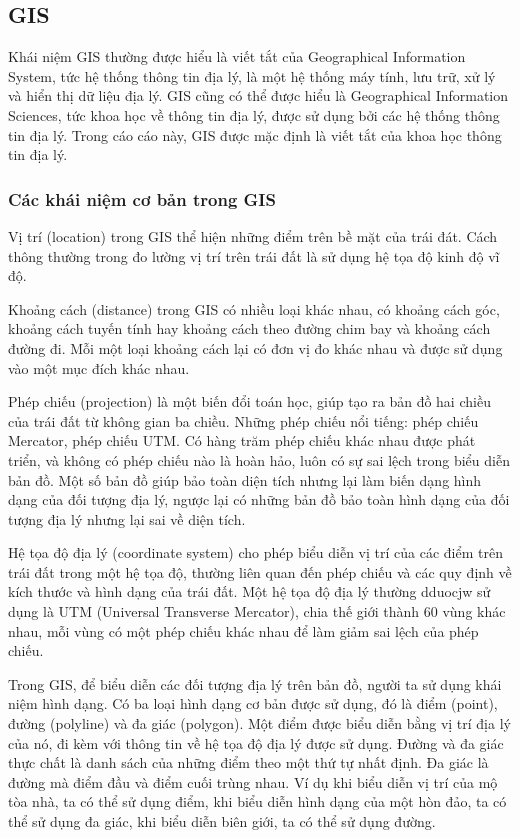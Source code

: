 \documentclass[14pt, oneside, a4paper, openany]{scrartcl}
\begin{document}
\subsection{GIS}
Khái niệm GIS thường được hiểu là viết tắt của Geographical Information System, tức hệ thống thông tin địa lý, là một hệ thống máy tính, lưu trữ, xử lý và hiển thị dữ liệu địa lý.
GIS cũng có thể được hiểu là Geographical Information Sciences, tức khoa học về thông tin địa lý, được sử dụng bởi các hệ thống thông tin địa lý. Trong cáo cáo này, GIS được mặc định là viết tắt của khoa học thông tin địa lý.
\subsubsection{Các khái niệm cơ bản trong GIS}
Vị trí (location) trong GIS thể hiện những điểm trên bề mặt của trái đát. Cách thông thường trong đo lường vị trí trên trái đất là sử dụng hệ tọa độ kinh độ vĩ độ.

Khoảng cách (distance) trong GIS có nhiều loại khác nhau, có khoảng cách góc, khoảng cách tuyến tính hay khoảng cách theo đường chim bay và khoảng cách đường đi. Mỗi một loại khoảng cách lại có đơn vị đo khác nhau và được sử dụng vào một mục đích khác nhau.

Phép chiếu (projection) là một biến đổi toán học, giúp tạo ra bản đồ hai chiều của trái đất từ không gian ba chiều. Những phép chiếu nổi tiếng: phép chiếu Mercator, phép chiếu UTM.
Có hàng trăm phép chiếu khác nhau được phát triển, và không có phép chiếu nào là hoàn hảo, luôn có sự sai lệch trong biểu diễn bản đồ. Một số bản đồ giúp bảo toàn diện tích nhưng lại làm biến dạng hình dạng của đối tượng địa lý, ngược lại có những bản đồ bảo toàn hình dạng của đối tượng địa lý nhưng lại sai về diện tích.

Hệ tọa độ địa lý (coordinate system) cho phép biểu diễn vị trí của các điểm trên trái đất trong một hệ tọa độ, thường liên quan đến phép chiếu và các quy định về kích thước và hình dạng của trái đất. Một hệ tọa độ địa lý thường dduocjw sử dụng là UTM (Universal Transverse Mercator), chia thế giới thành 60 vùng khác nhau, mỗi vùng có một phép chiếu khác nhau để làm giảm sai lệch của phép chiếu.

Trong GIS, để biểu diễn các đối tượng địa lý trên bản đồ, người ta sử dụng khái niệm hình dạng. Có ba loại hình dạng cơ bản được sử dụng, đó là điểm (point), đường (polyline) và đa giác (polygon).
Một điểm được biểu diễn bằng vị trí địa lý của nó, đi kèm với thông tin về hệ tọa độ địa lý được sử dụng.
Đường và đa giác thực chất là danh sách của những điểm theo một thứ tự nhất định.
Đa giác là đường mà điểm đầu và điểm cuối trùng nhau.
Ví dụ khi biểu diễn vị trí của mộ tòa nhà, ta có thể sử dụng điểm, khi biểu diễn hình dạng của một hòn đảo, ta có thể sử dụng đa giác, khi biểu diễn biên giới, ta có thể sử dụng đường.
\end{document}
